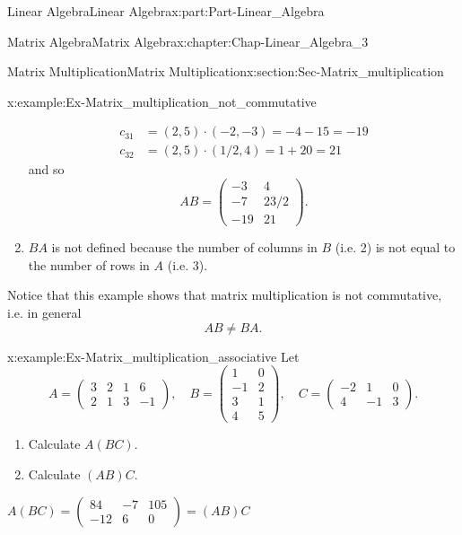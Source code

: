 \documentclass[oneside,10pt,]{book}
\numberwithin{equation}{section}
\newcommand{\amp}{&}
\begin{document}
\begin{partptx}{Linear Algebra}{}{Linear Algebra}{}{}{x:part:Part-Linear_Algebra}
\begin{chapterptx}{Matrix Algebra}{}{Matrix Algebra}{}{}{x:chapter:Chap-Linear_Algebra_3}
\begin{sectionptx}{Matrix Multiplication}{}{Matrix Multiplication}{}{}{x:section:Sec-Matrix_multiplication}
\begin{example}{}{x:example:Ex-Matrix_multiplication_not_commutative}
\begin{enumerate}[label=\alph*]
\begin{align*}
c_{31} \amp = (2,5)\cdot (-2,-3) = -4 -15 = -19 \\
c_{32} \amp = (2,5)\cdot (1/2,4) = 1 + 20  = 21 
\end{align*}
and so%
\begin{equation*}
AB=\begin{pmatrix} -3 \amp 4 \\ -7 \amp 23/2 \\ -19 \amp 21 \end{pmatrix}.
\end{equation*}
%
\item{}\(BA\) is not defined because the number of columns in \(B\) (i.e. 2) is not equal to the number of rows in \(A\) (i.e. 3).%
\end{enumerate}
Notice that this example shows that matrix multiplication is not commutative, i.e. in general%
\begin{equation*}
AB \neq BA.
\end{equation*}
%
\end{example}
\begin{example}{}{x:example:Ex-Matrix_multiplication_associative}%
Let%
\begin{equation*}
A=\begin{pmatrix} 3\amp 2 \amp 1 \amp 6 \\ 2 \amp 1 \amp 3 \amp -1\end{pmatrix},  \quad  B=\begin{pmatrix} 1 \amp 0 \\ -1 \amp 2 \\ 3 \amp 1 \\ 4 \amp 5 \end{pmatrix}, \quad C =\begin{pmatrix}-2 \amp 1 \amp 0 \\ 4 \amp -1 \amp 3\end{pmatrix}.
\end{equation*}
%
\begin{enumerate}[label=\alph*]
\item{}Calculate \(A(BC)\).%
\item{}Calculate \((AB)C\).%
\end{enumerate}
%
\par\smallskip%
\noindent\hypertarget{g:answer:id570540}{}\(A(BC) =  \begin{pmatrix}84 \amp -7 \amp 105 \\ -12 \amp 6 \amp 0\end{pmatrix} = (AB)C\)%
\par\smallskip%

\end{example}
\end{sectionptx}
\end{chapterptx}
\end{partptx}
\end{document}

